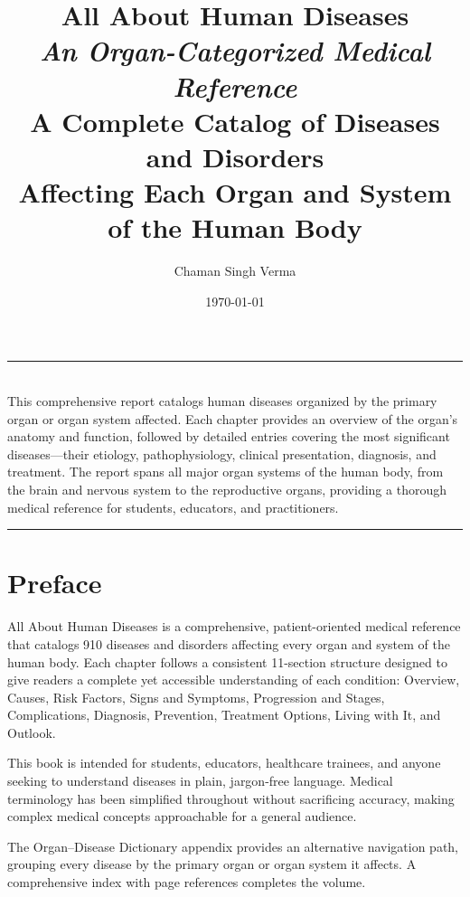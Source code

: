 \documentclass[12pt,a4paper,twoside]{book}
\title{%
  \vspace{-1cm}
  {\Huge\bfseries All About Human Diseases}\\[1em]
  {\Large\itshape An Organ-Categorized Medical Reference}\\[0.5em]
  {\normalsize A Complete Catalog of Diseases and Disorders\\
   Affecting Each Organ and System of the Human Body}
}
\author{Chaman Singh Verma}
\date{\today}
\begin{document}


\frontmatter

\maketitle
\thispagestyle{empty}

\vfill
\begin{center}
\rule{0.6\textwidth}{0.4pt}\\[12pt]
{\small
This comprehensive report catalogs human diseases organized by the primary
organ or organ system affected. Each chapter provides an overview of the
organ's anatomy and function, followed by detailed entries covering the
most significant diseases---their etiology, pathophysiology, clinical
presentation, diagnosis, and treatment. The report spans all major organ
systems of the human body, from the brain and nervous system to the
reproductive organs, providing a thorough medical reference for students,
educators, and practitioners.}
\\[12pt]
\rule{0.6\textwidth}{0.4pt}
\end{center}
\vfill

\tableofcontents

\clearpage
\chapter*{Preface}

\noindent
All About Human Diseases is a comprehensive, patient-oriented medical reference
that catalogs 910 diseases and disorders affecting every organ and system of
the human body. Each chapter follows a consistent 11-section structure designed
to give readers a complete yet accessible understanding of each condition:
Overview, Causes, Risk Factors, Signs and Symptoms, Progression and Stages,
Complications, Diagnosis, Prevention, Treatment Options, Living with It,
and Outlook.

\vspace{12pt}
\noindent
This book is intended for students, educators, healthcare trainees, and anyone
seeking to understand diseases in plain, jargon-free language. Medical
terminology has been simplified throughout without sacrificing accuracy, making
complex medical concepts approachable for a general audience.

\vspace{12pt}
\noindent
The Organ--Disease Dictionary appendix provides an alternative navigation
path, grouping every disease by the primary organ or organ system it affects.
A comprehensive index with page references completes the volume.
\end{document}
